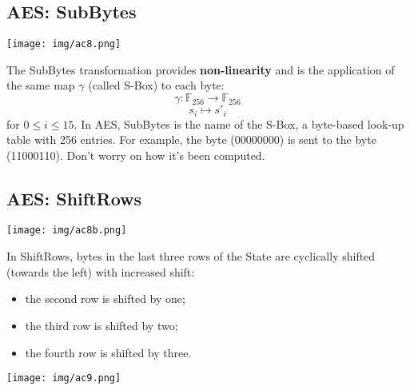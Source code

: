 \documentclass[a4paper, 10pt, titlepage]{article}
\begin{document}
\subsection{AES: SubBytes}
\begin{minipage}{0.3\textwidth}
\texttt{[image: img/ac8.png]}
\end{minipage}
\hfill
\begin{minipage}{0.6\textwidth}
The SubBytes transformation provides \textbf{non-linearity} and is the application of the same map $\gamma$ (called S-Box) to each byte:
$$\gamma: \mathbb{F}_{256} \rightarrow \mathbb{F}_{256}$$
$$s_i \mapsto s'_i$$
for $0 \leq i \leq 15$.
In AES, SubBytes is the name of the S-Box, a byte-based look-up table with 256 entries. For example, the byte (00000000) is sent to the byte (11000110). Don't worry on how it's been computed.
\end{minipage}

\subsection{AES: ShiftRows}
\begin{minipage}{0.3\textwidth}
\texttt{[image: img/ac8b.png]}
\end{minipage}
\begin{minipage}{0.6\textwidth}
In ShiftRows, bytes in the last three rows of the State are cyclically shifted (towards the left) with increased shift:
\begin{itemize}
\item the second row is shifted by one;
\item the third row is shifted by two;
\item the fourth row is shifted by three.
\end{itemize}
\texttt{[image: img/ac9.png]}
\end{minipage}
\end{document}
